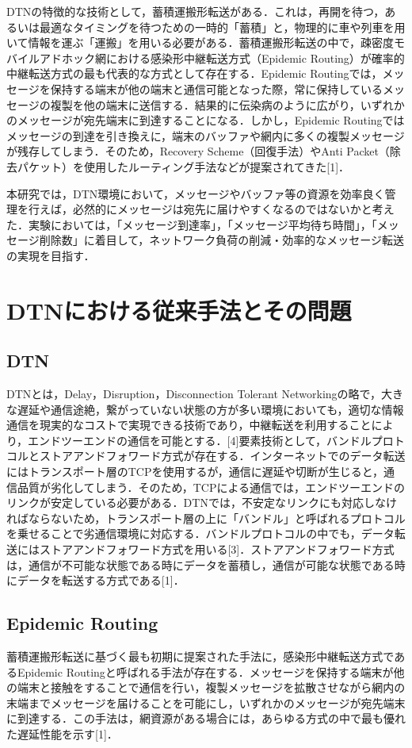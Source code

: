 \documentclass[11pt]{icsthesis}
\begin{document}
DTNの特徴的な技術として，蓄積運搬形転送がある．これは，再開を待つ，あるいは最適なタイミングを待つための一時的「蓄積」と，物理的に車や列車を用いて情報を運ぶ「運搬」を用いる必要がある．蓄積運搬形転送の中で，疎密度モバイルアドホック網における感染形中継転送方式（Epidemic Routing）が確率的中継転送方式の最も代表的な方式として存在する．Epidemic Routingでは，メッセージを保持する端末が他の端末と通信可能となった際，常に保持しているメッセージの複製を他の端末に送信する．結果的に伝染病のように広がり，いずれかのメッセージが宛先端末に到達することになる．しかし，Epidemic Routingではメッセージの到達を引き換えに，端末のバッファや網内に多くの複製メッセージが残存してしまう．そのため，Recovery Scheme（回復手法）やAnti Packet（除去パケット）を使用したルーティング手法などが提案されてきた[1]．

本研究では，DTN環境において，メッセージやバッファ等の資源を効率良く管理を行えば，必然的にメッセージは宛先に届けやすくなるのではないかと考えた．実験においては，「メッセージ到達率」，「メッセージ平均待ち時間」，「メッセージ削除数」に着目して，ネットワーク負荷の削減・効率的なメッセージ転送の実現を目指す．

\chapter{DTNにおける従来手法とその問題}
\section{DTN}
DTNとは，Delay，Disruption，Disconnection Tolerant Networkingの略で，大きな遅延や通信途絶，繋がっていない状態の方が多い環境においても，適切な情報通信を現実的なコストで実現できる技術であり，中継転送を利用することにより，エンドツーエンドの通信を可能とする．[4]要素技術として，バンドルプロトコルとストアアンドフォワード方式が存在する．インターネットでのデータ転送にはトランスポート層のTCPを使用するが，通信に遅延や切断が生じると，通信品質が劣化してしまう．そのため，TCPによる通信では，エンドツーエンドのリンクが安定している必要がある．DTNでは，不安定なリンクにも対応しなければならないため，トランスポート層の上に「バンドル」と呼ばれるプロトコルを乗せることで劣通信環境に対応する．バンドルプロトコルの中でも，データ転送にはストアアンドフォワード方式を用いる[3]．ストアアンドフォワード方式は，通信が不可能な状態である時にデータを蓄積し，通信が可能な状態である時にデータを転送する方式である[1]．

\section{Epidemic Routing}
蓄積運搬形転送に基づく最も初期に提案された手法に，感染形中継転送方式であるEpidemic Routingと呼ばれる手法が存在する．メッセージを保持する端末が他の端末と接触をすることで通信を行い，複製メッセージを拡散させながら網内の末端までメッセージを届けることを可能にし，いずれかのメッセージが宛先端末に到達する．この手法は，網資源がある場合には，あらゆる方式の中で最も優れた遅延性能を示す[1]．
\end{document}
